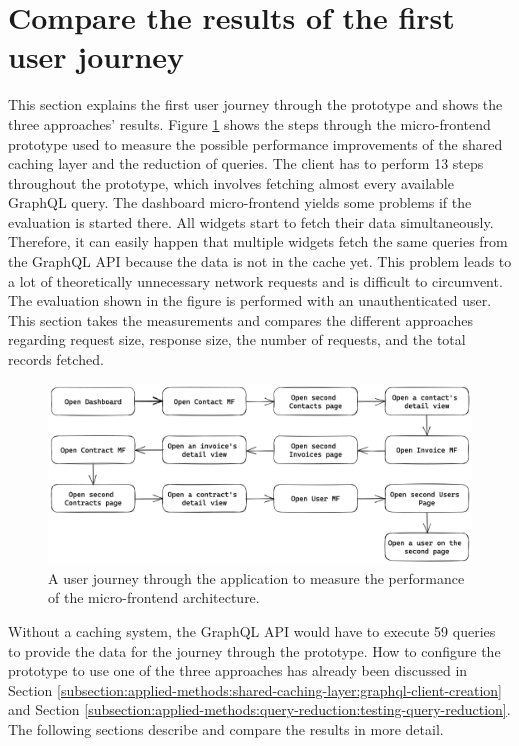 \section{Compare the results of the first user journey}\label{section:results:comparison-first-journey}

This section explains the first user journey through the prototype and shows the three approaches' results. Figure \ref{fig:results:evaluation-first-path} shows the steps through the micro-frontend prototype used to measure the possible performance improvements of the shared caching layer and the reduction of queries. The client has to perform 13 steps throughout the prototype, which involves fetching almost every available GraphQL query. The dashboard micro-frontend yields some problems if the evaluation is started there. All widgets start to fetch their data simultaneously. Therefore, it can easily happen that multiple widgets fetch the same queries from the GraphQL \ac{API} because the data is not in the cache yet. This problem leads to a lot of theoretically unnecessary network requests and is difficult to circumvent. The evaluation shown in the figure is performed with an unauthenticated user. This section takes the measurements and compares the different approaches regarding request size, response size, the number of requests, and the total records fetched.

\ifshowImages
\begin{figure}[H]
  \centering
  \includegraphics[width=1\linewidth]{images/results/evaluation-first-path.png}
  \caption{A user journey through the application to measure the performance of the micro-frontend architecture.}\label{fig:results:evaluation-first-path}
\end{figure}
\fi

\noindent Without a caching system, the GraphQL \ac{API} would have to execute 59 queries to provide the data for the journey through the prototype. How to configure the prototype to use one of the three approaches has already been discussed in Section \ref{subsection:applied-methods:shared-caching-layer:graphql-client-creation} and Section \ref{subsection:applied-methods:query-reduction:testing-query-reduction}. The following sections describe and compare the results in more detail.

